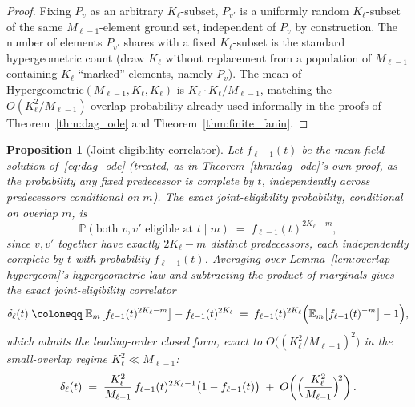 \documentclass[11pt,a4paper]{report}
\newtheorem{proposition}[theorem]{Proposition}
\begin{document}
\begin{proof}
Fixing $P_v$ as an arbitrary $K_\ell$-subset, $P_{v'}$ is a uniformly
random $K_\ell$-subset of the same $M_{\ell-1}$-element ground set,
independent of $P_v$ by construction. The number of elements
$P_{v'}$ shares with a fixed $K_\ell$-subset is the standard
hypergeometric count (draw $K_\ell$ without replacement from a
population of $M_{\ell-1}$ containing $K_\ell$ ``marked'' elements,
namely $P_v$). The mean of
$\mathrm{Hypergeometric}(M_{\ell-1},K_\ell,K_\ell)$ is
$K_\ell \cdot K_\ell/M_{\ell-1}$, matching the $O(K_\ell^2/M_{\ell-1})$
overlap probability already used informally in the proofs of
Theorem~\ref{thm:dag_ode} and Theorem~\ref{thm:finite_fanin}.
\end{proof}

\begin{proposition}[Joint-eligibility correlator]
\label{prop:dag-overlap-correction}
Let $f_{\ell-1}(t)$ be the mean-field solution of~\eqref{eq:dag_ode}
(treated, as in Theorem~\ref{thm:dag_ode}'s own proof, as the
probability any fixed predecessor is complete by $t$, independently
across predecessors conditional on $m$). The exact joint-eligibility
probability, conditional on overlap $m$, is
\begin{equation}
  \mathbb{P}(\text{both } v, v' \text{ eligible at } t \mid m)
  \;=\;
  f_{\ell-1}(t)^{2K_\ell - m},
  \label{eq:joint-elig-cond}
\end{equation}
since $v,v'$ together have exactly $2K_\ell - m$ distinct
predecessors, each independently complete by $t$ with probability
$f_{\ell-1}(t)$. Averaging over Lemma~\ref{lem:overlap-hypergeom}'s
hypergeometric law and subtracting the product of marginals gives the
exact \emph{joint-eligibility correlator}
\begin{equation}
  \delta_\ell(t)
  \;\coloneqq\;
  \mathbb{E}_m\bigl[f_{\ell-1}(t)^{2K_\ell-m}\bigr] - f_{\ell-1}(t)^{2K_\ell}
  \;=\;
  f_{\ell-1}(t)^{2K_\ell}\Bigl(\mathbb{E}_m\bigl[f_{\ell-1}(t)^{-m}\bigr] - 1\Bigr),
  \label{eq:delta-exact}
\end{equation}
which admits the leading-order closed form, exact to
$O\bigl((K_\ell^2/M_{\ell-1})^2\bigr)$ in the small-overlap regime
$K_\ell^2 \ll M_{\ell-1}$:
\begin{equation}
  \delta_\ell(t)
  \;=\;
  \frac{K_\ell^2}{M_{\ell-1}}\, f_{\ell-1}(t)^{2K_\ell-1}\bigl(1-f_{\ell-1}(t)\bigr)
  \;+\; O\!\left(\Bigl(\frac{K_\ell^2}{M_{\ell-1}}\Bigr)^{\!2}\right).
  \label{eq:delta-leading}
\end{equation}
\end{proposition}
\end{document}

